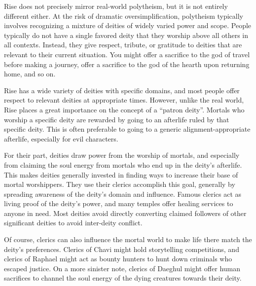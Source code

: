     Rise does not precisely mirror real-world polytheism, but it is not entirely different either.
    At the risk of dramatic oversimplification, polytheism typically involves recognizing a mixture of deities of widely varied power and scope.
    People typically do not have a single favored deity that they worship above all others in all contexts.
    Instead, they give respect, tribute, or gratitude to deities that are relevant to their current situation.
    You might offer a sacrifice to the god of travel before making a journey, offer a sacrifice to the god of the hearth upon returning home, and so on.

    Rise has a wide variety of deities with specific domains, and most people offer respect to relevant deities at appropriate times.
    However, unlike the real world, Rise places a great importance on the concept of a ``patron deity''.
    Mortals who worship a specific deity are rewarded by going to an afterlife ruled by that specific deity.
    This is often preferable to going to a generic alignment-appropriate afterlife, especially for evil characters.

    For their part, deities draw power from the worship of mortals, and especially from claiming the soul energy from mortals who end up in the deity's afterlife.
    This makes deities generally invested in finding ways to increase their base of mortal worshippers.
    They use their clerics accomplish this goal, generally by spreading awareness of the deity's domain and influence.
    Famous clerics act as living proof of the deity's power, and many temples offer healing services to anyone in need.
    Most deities avoid directly converting claimed followers of other significant deities to avoid inter-deity conflict.

    Of course, clerics can also influence the mortal world to make life there match the deity's preferences.
    Clerics of Chavi might hold storytelling competitions, and clerics of Raphael might act as bounty hunters to hunt down criminals who escaped justice.
    On a more sinister note, clerics of Daeghul might offer human sacrifices to channel the soul energy of the dying creatures towards their deity.
